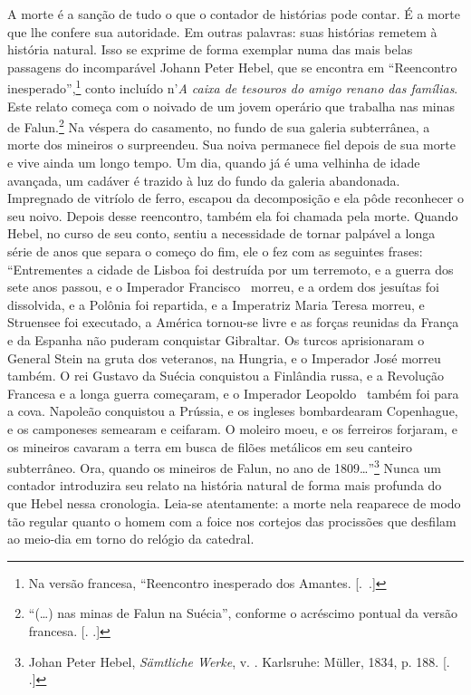 A morte é a sanção de tudo o que o contador de histórias pode contar. É
a morte que lhe confere sua autoridade. Em outras palavras: suas
histórias remetem à história natural. Isso se exprime de forma exemplar
numa das mais belas passagens do incomparável Johann Peter Hebel, que se
encontra em ``Reencontro inesperado'',\footnote{Na versão francesa,
  ``Reencontro inesperado dos Amantes. [.~.]} conto
incluído n'\emph{A caixa de tesouros do amigo renano das famílias}. Este
relato começa com o noivado de um jovem operário que trabalha nas minas
de Falun.\footnote{``(\ldots{}) nas minas de Falun na Suécia'', conforme o
  acréscimo pontual da versão francesa. [. .]} Na véspera do
casamento, no fundo de sua galeria subterrânea, a morte dos mineiros o
surpreendeu. Sua noiva permanece fiel depois de sua morte e vive ainda
um longo tempo. Um dia, quando já é uma velhinha de idade avançada, um
cadáver é trazido à luz do fundo da galeria abandonada. Impregnado de
vitríolo de ferro, escapou da decomposição e ela pôde reconhecer o seu
noivo. Depois desse reencontro, também ela foi chamada pela morte.
Quando Hebel, no curso de seu conto, sentiu a necessidade de tornar
palpável a longa série de anos que separa o começo do fim, ele o fez com
as seguintes frases: ``Entrementes a cidade de Lisboa foi destruída por
um terremoto, e a guerra dos sete anos passou, e o Imperador Francisco~
morreu, e a ordem dos jesuítas foi dissolvida, e a Polônia foi
repartida, e a Imperatriz Maria Teresa morreu, e Struensee foi
executado, a América tornou-se livre e as forças reunidas da França e da
Espanha não puderam conquistar Gibraltar. Os turcos aprisionaram o
General Stein na gruta dos veteranos, na Hungria, e o Imperador José
morreu também. O rei Gustavo da Suécia conquistou a Finlândia russa, e a
Revolução Francesa e a longa guerra começaram, e o Imperador Leopoldo~
também foi para a cova. Napoleão conquistou a Prússia, e os ingleses
bombardearam Copenhague, e os camponeses semearam e ceifaram. O moleiro
moeu, e os ferreiros forjaram, e os mineiros cavaram a terra em busca de
filões metálicos em seu canteiro subterrâneo. Ora, quando os mineiros de
Falun, no ano de 1809\ldots{}''\footnote{Johan Peter Hebel, \emph{Sämtliche
  Werke}, v. . Karlsruhe: Müller, 1834, p. 188. [. .]}
Nunca um contador introduzira seu relato na história natural de forma
mais profunda do que Hebel nessa cronologia. Leia-se atentamente: a
morte nela reaparece de modo tão regular quanto o homem com a foice nos
cortejos das procissões que desfilam ao meio-dia em torno do relógio da
catedral.


